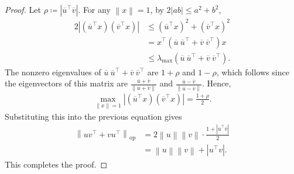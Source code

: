 \documentclass[11pt]{article}
\theoremstyle{definition}
\theoremstyle{plain}
\newcommand{\abs}[1]{\left| #1 \right|}
\newcommand{\Norm}[1]{\left\| #1 \right\|}
\providecommand{\norm}[1]{\Norm{#1}}
\begin{document}
\begin{proof}
    Let $\rho\coloneq \abs{\overline{u}^{\top}\overline{v}}$. For any
    $\norm{x}=1$, by $2|ab|\leq a^{2}+b^{2}$,
    \begin{align}
        2\abs{
        (\overline{u}^{\top}x)(\overline{v}^{\top}x)
        }
        &\leq
        (\overline{u}^{\top}x)^{2}
        +
        (\overline{v}^{\top}x)^{2} \\
        &=
        x^{\top}
        \left(
        \overline{u}\ \overline{u}^{\top}
        +
        \overline{v}\ \overline{v}^{\top}
        \right)x \\
        &\leq
        \lambda_{\max}
        \left(
        \overline{u}\ \overline{u}^{\top}
        +
        \overline{v}\ \overline{v}^{\top}
        \right).
    \end{align}
    The nonzero eigenvalues of
    $\overline{u}\ \overline{u}^{\top}
    +
    \overline{v}\ \overline{v}^{\top}$
    are $1+\rho$ and $1-\rho$, which follows since the eigenvectors of this matrix are $\frac{\overline{u} + \overline{v}}{\norm{\overline{u} + \overline{v}}}$ and $\frac{\overline{u} - \overline{v}}{\norm{\overline{u} - \overline{v}}}$. Hence,
    \begin{align}
        \max_{\norm{x}=1}
        \abs{
        (\overline{u}^{\top}x)(\overline{v}^{\top}x)
        }
        =
        \frac{1+\rho}{2}.
    \end{align}
    Substituting this into the previous equation gives
    \begin{align}
        \norm{uv^{\top}+vu^{\top}}_{\mathrm{op}}
        &=
        2\norm{u}\norm{v}\cdot
        \frac{1+\abs{\overline{u}^{\top}\overline{v}}}{2} \\
        &=
        \norm{u}\norm{v}
        +
        \abs{u^{\top}v}.
    \end{align}
    This completes the proof.
\end{proof}
\end{document}
